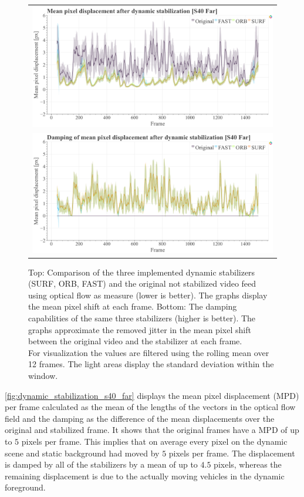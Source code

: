 \begin{figure}[t]
    \centering
    \begin{tabular}{c}
      \includegraphics[width=0.9\linewidth]{diagrams/optical_flow/s40_n_far_image_raw.mp4.csv/compare_of_mean_pixel_displacement/window_size_12.html.png}    \\  
      \includegraphics[width=0.9\linewidth]{diagrams/optical_flow/s40_n_far_image_raw.mp4.csv/deltas_of_mean_pixel_displacement/window_size_12.html.png}    
\end{tabular}
    \caption{Top: 
        Comparison of the three implemented dynamic stabilizers (SURF, ORB, FAST) and the original not stabilized video feed using optical flow as measure (lower is better).
        The graphs display the mean pixel shift at each frame. 
        Bottom: 
        The damping capabilities of the same three stabilizers (higher is better). 
        The graphs approximate the removed jitter in the mean pixel shift between the original video and the stabilizer at each frame.\\
        For visualization the values are filtered using the rolling mean over 12 frames. 
        The light areas display the standard deviation within the window.
    }
    \label{fig:dynamic_stabilization_s40_far}
\end{figure}

\autoref{fig:dynamic_stabilization_s40_far} displays the mean pixel displacement (MPD) per frame calculated as the mean of the lengths of the vectors in the optical flow field and the damping as the difference of the mean displacements over the original and stabilized frame.
It shows that the original frames have a MPD of up to $5$ pixels per frame. This implies that on average every pixel on the dynamic scene and static background had moved by $5$ pixels per frame. 
The displacement is damped by all of the stabilizers by a mean of up to $4.5$ pixels, whereas the remaining displacement is due to the actually moving vehicles in the dynamic foreground.   

